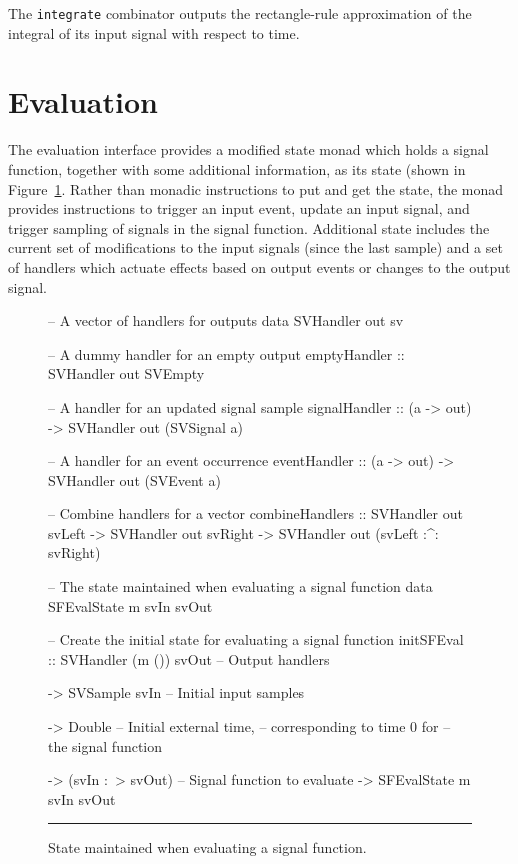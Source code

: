 The {\tt integrate} combinator outputs the rectangle-rule approximation of the
integral of its input signal with respect to time.

\section{Evaluation}
\label{section:System_Design_and_Interface-Evaluator}

The evaluation interface provides a modified state monad which holds a signal
function, together with some additional information, as its state (shown in Figure~\ref{figure:evaluation_state}.
Rather than monadic instructions to put and get the state, the monad provides instructions
to trigger an input event, update an input signal, and trigger sampling of
signals in the signal function. Additional state includes the current set of
modifications to the input signals (since the last sample) and a set of
handlers which actuate effects based on output events or changes to the output
signal.

\begin{figure}
\begin{code}
-- A vector of handlers for outputs
data SVHandler out sv

-- A dummy handler for an empty output
emptyHandler    :: SVHandler out SVEmpty

-- A handler for an updated signal sample
signalHandler   :: (a -> out) -> SVHandler out (SVSignal a)

-- A handler for an event occurrence
eventHandler    :: (a -> out) -> SVHandler out (SVEvent a)

-- Combine handlers for a vector
combineHandlers ::    SVHandler out svLeft
                   -> SVHandler out svRight
                   -> SVHandler out (svLeft :^: svRight)

-- The state maintained when evaluating a signal function
data SFEvalState m svIn svOut

-- Create the initial state for evaluating a signal function
initSFEval ::    SVHandler (m ()) svOut   -- Output handlers

              -> SVSample svIn            -- Initial input samples
              
              -> Double                   -- Initial external time,
                                          -- corresponding to time 0 for
                                          -- the signal function
                                          
              -> (svIn :~> svOut)         -- Signal function to evaluate
              -> SFEvalState m svIn svOut
\end{code}
\hrule
\caption{State maintained when evaluating a signal function.}
\label{figure:evaluation_state}
\end{figure}

